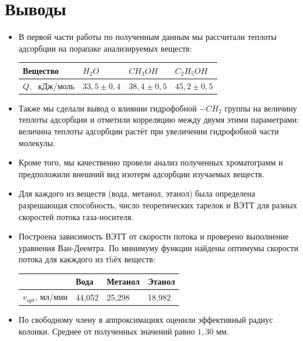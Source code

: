 \documentclass{article}
\begin{document}
\section{Выводы}
\begin{itemize}
    \item В первой части работы по полученным данным мы рассчитали теплоты адсорбции на порапаке анализируемых веществ:
    \begin{table}[h!]
    \centering
    \begin{tabular}{|l|l|l|l|}
    \hline
    Вещество & $H_2O$ & $CH_3OH$ & $C_2H_5OH$ \\ \hline
    $Q,\;$ кДж/моль & $33,5 \pm 0,4$ & $38,4 \pm 0,5$ & $45,2 \pm 0,5$ \\ \hline
    \end{tabular}
    \end{table}
    \item Также мы сделали вывод о влиянии гидрофобной $-CH_2$ группы на величину теплоты адсорбции и отметили корреляцию между двумя этими параметрами: величина теплоты адсорбции растёт при увеличении гидрофобной части молекулы.
    \item Кроме того, мы качественно провели анализ полученных хроматограмм и предположили внешний вид изотерм адсорбции изучаемых веществ.
    \item Для каждого из веществ (вода, метанол, этанол) была определена разрешающая способность, число теоретических тарелок и ВЭТТ для разных скоростей потока газа-носителя.
    \item Построена зависимость ВЭТТ от скорости потока и проверено выполнение уравнения Ван-Деемтра. По минимуму функции найдены оптимумы скорости потока для какждого из тhёх веществ:
    \begin{table}[h!]
    \centering
    \begin{tabular}{|l|l|l|l|}
    \hline
             & Вода   & Метанол & Этанол \\ \hline
    $v_{opt}$, мл/мин & 44,052 & 25,298  & 18,982 \\ \hline
    \end{tabular}
    \end{table}
    \item По свободному члену в аппроксимациях оценили эффективный радиус колонки. Среднее от полученных значений равно $1,30$ мм. 
\end{itemize}
\end{document}
